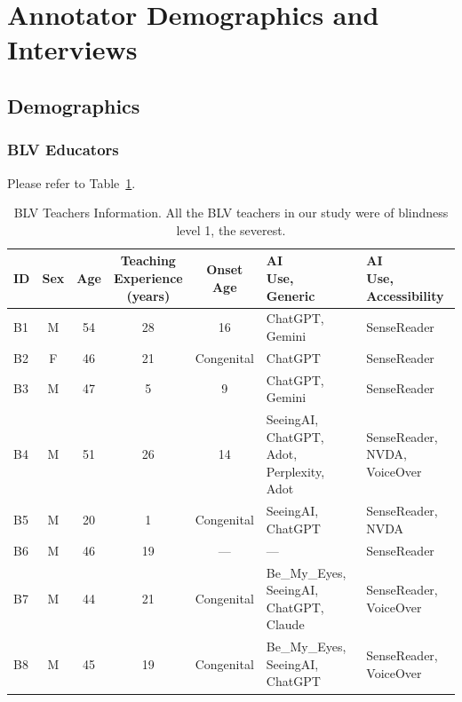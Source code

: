 \section{Annotator Demographics and Interviews}\label{app:demo}

\subsection{Demographics}

\subsubsection{BLV Educators}
Please refer to Table~\ref{tab:blv_educators_demo}.

\begin{table}[h!]
    \centering
    \tiny
    \begin{tabular}{lccccll}
    \toprule
    \textbf{ID} & \textbf{Sex} & \textbf{Age} & \makecell[c]{\textbf{Teaching}\\\textbf{Experience}\\\textbf{(years)}} & \makecell[c]{\textbf{Onset}\\\textbf{Age}} & \makecell[c]{\textbf{AI}\\\textbf{Use,}\\\textbf{Generic}} & \makecell[c]{\textbf{AI}\\\textbf{Use,}\\\textbf{Accessibility}} \\
    \midrule
    B1 & M & 54 & 28  & 16 & ChatGPT, Gemini & SenseReader \\
    B2 & F & 46 & 21  & Congenital & ChatGPT & SenseReader \\
    B3 & M & 47 & 5  & 9 & ChatGPT, Gemini & SenseReader \\
    B4 & M & 51 & 26 & 14 & SeeingAI, ChatGPT, Adot, Perplexity, Adot & SenseReader, NVDA, VoiceOver \\
    B5 & M & 20 &  1 & Congenital & SeeingAI, ChatGPT & SenseReader, NVDA \\
    B6 & M & 46 & 19 & --- & --- & SenseReader \\
    B7 & M & 44 & 21 &  Congenital & Be\_My\_Eyes, SeeingAI, ChatGPT, Claude & SenseReader, VoiceOver \\
    B8 & M & 45 & 19 &  Congenital & Be\_My\_Eyes, SeeingAI, ChatGPT & SenseReader, VoiceOver \\
    \bottomrule
    \end{tabular}
    \caption{BLV Teachers Information. All the BLV teachers in our study were of blindness level 1, the severest.}
    \label{tab:blv_educators_demo}
\end{table}


